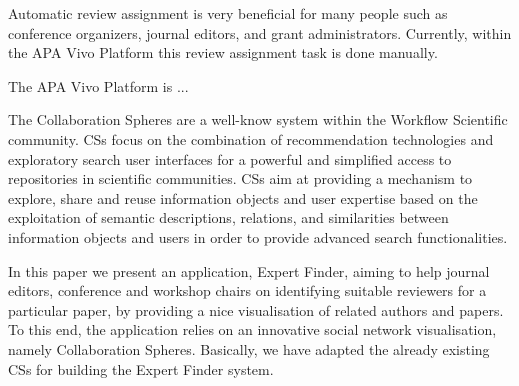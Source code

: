 Automatic review assignment is very beneficial for many people such as conference organizers, journal editors, and grant administrators. Currently, within the APA Vivo Platform \cite{harren_2012} this review assignment task is done manually. 

The APA Vivo Platform is ...

The Collaboration Spheres \cite{} are a well-know system within the Workflow Scientific community. CSs focus on the combination of recommendation technologies and exploratory search user interfaces for a powerful and simplified access to repositories in scientific communities. CSs aim at providing a mechanism to explore, share and reuse information objects and user expertise based on the exploitation of semantic descriptions, relations, and similarities between information objects and users in order to provide advanced search functionalities.

In this paper we present an application, Expert Finder, aiming to help journal editors, conference and workshop chairs on identifying suitable reviewers for a particular paper, by providing a nice visualisation of related authors and papers. To this end, the application relies on an innovative social network visualisation, namely Collaboration Spheres. Basically, we have adapted the already existing CSs for building the Expert Finder system.



 
